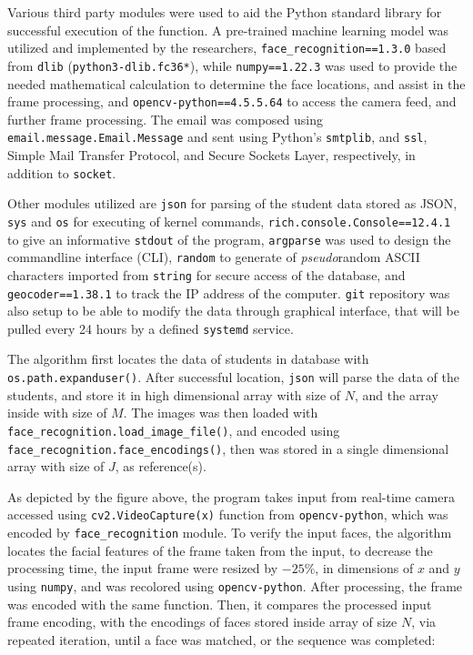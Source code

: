 \documentclass[12pt]{article}
\begin{document}
Various third party modules were used to aid the Python standard library for successful execution of the function. A pre-trained machine learning model was utilized and implemented by the researchers, \texttt{face\_recognition==1.3.0} based from \texttt{dlib} (\texttt{python3-dlib.fc36*}), while \texttt{numpy==1.22.3} was used to provide the needed mathematical calculation to determine the face locations, and assist in the frame processing, and \texttt{opencv-python==4.5.5.64} to access the camera feed, and further frame processing. The email was composed using \texttt{email.message.Email.Message} and sent using Python's \texttt{smtplib}, and \texttt{ssl}, Simple Mail Transfer Protocol, and Secure Sockets Layer, respectively, in addition to \texttt{socket}.

Other modules utilized are \texttt{json} for parsing of the student data stored as JSON, \texttt{sys} and \texttt{os} for executing of kernel commands, \texttt{rich.console.Console==12.4.1} to give an informative \texttt{stdout} of the program, \texttt{argparse} was used to design the commandline interface (CLI), \texttt{random} to generate of \textit{pseudo}random ASCII characters imported from \texttt{string} for secure access of the database, and \texttt{geocoder==1.38.1} to track the IP address of the computer. \texttt{git} repository was also setup to be able to modify the data through graphical interface, that will be pulled every 24 hours by a defined \texttt{systemd} service.

The algorithm first locates the data of students in database with \texttt{os.path.expanduser()}. After successful location, \texttt{json} will parse the data of the students, and store it in high dimensional array with size of $N$, and the array inside with size of $M$. The images was then loaded with \texttt{face\_recognition.load\_image\_file()},  and encoded using \texttt{face\_recognition.face\_encodings()}, then was stored in a single dimensional array with size of $J$, as reference(s).

As depicted by the figure above, the program takes input from real-time camera accessed using \texttt{cv2.VideoCapture(x)} function from \texttt{opencv-python}, which was encoded by \texttt{face\_recognition} module. To verify the input faces, the algorithm locates the facial features of the frame taken from the input, to decrease the processing time, the input frame were resized by $-25\%$, in dimensions of $x$ and $y$ using \texttt{numpy}, and was recolored using \texttt{opencv-python}. After processing, the frame was encoded with the same function. Then, it compares the processed input frame encoding, with the encodings of faces stored inside array of size $N$, via repeated iteration, until a face was matched, or the sequence was completed:
\end{document}
